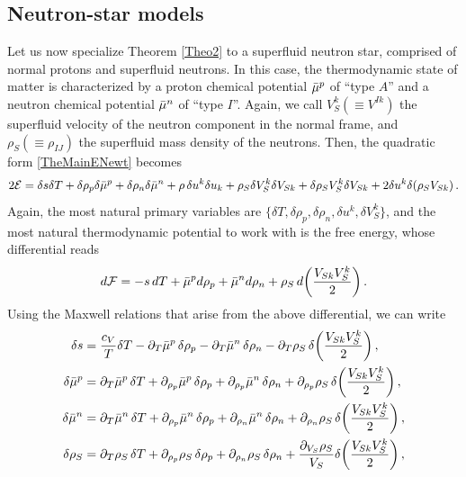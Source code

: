 \documentclass[a4paper, amsfonts, amssymb, amsmath, reprint, showkeys, nofootinbib, twoside,notitlepage,onecolumn]{revtex4-2}
\theoremstyle{definition}
\theoremstyle{theorem}
\theoremstyle{corollary}
\begin{document}
 
\subsection{Neutron-star models}

Let us now specialize Theorem \ref{Theo2} to a superfluid neutron star, comprised of normal protons and superfluid neutrons. In this case, the thermodynamic state of matter is characterized by a proton chemical potential $\Bar{\mu}^p$ of ``type $A$'' and a neutron chemical potential $\Bar{\mu}^n$ of ``type $I$''. Again, we call $V_S^k (\equiv V^{Ik})$ the superfluid velocity of the neutron component in the normal frame, and $\rho_S(\equiv \rho_{IJ})$ the superfluid mass density of the neutrons. Then, the quadratic form \eqref{TheMainENewt} becomes
\begin{equation}\label{NeutronStar}
2\mathcal{E}= \delta s \delta T+ \delta \rho_p \delta \Bar{\mu}^p +\delta \rho_n \delta \Bar{\mu}^n+ \rho\,\delta u^k \delta u_k +\rho_{S} \delta V^{k}_S\delta V_{Sk}  +\delta \rho_{S} V^{k}_S\delta V_{Sk} +2 \delta u^k  \delta ( \rho_{S} V_{Sk})  \, .
\end{equation}
Again, the most natural primary variables are $\{ \delta T, \delta \rho_p,\delta \rho_n,\delta u^k,\delta V_S^k\}$, and the most natural thermodynamic potential to work with is the free energy, whose differential reads
\begin{equation}\label{dPlutarco}
d\mathcal{F}= -s\, dT + \Bar{\mu}^p d\rho_p+ \Bar{\mu}^n d\rho_n  + \rho_S \,  d\bigg(\dfrac{V_{Sk} V_S^{k}}{2} \bigg) \, .
\end{equation}
Using the Maxwell relations that arise from the above differential, we can write
\begin{equation}
\begin{split}
\delta s ={}& \dfrac{c_V}{T} \delta T -\partial_T \Bar{\mu}^p \,  \delta \rho_p-\partial_T \Bar{\mu}^n \,  \delta \rho_n -\partial_T \rho_S \, \delta \bigg(\dfrac{V_{Sk} V_S^{k}}{2} \bigg)  \, , \\
\delta \Bar{\mu}^p ={}& \partial_T \Bar{\mu}^p \,\delta T +\partial_{\rho_p} \Bar{\mu}^p \, \delta \rho_p+\partial_{\rho_p} \Bar{\mu}^n \, \delta \rho_n +\partial_{\rho_p} \rho_S \, \delta \bigg(\dfrac{V_{Sk} V_S^{k}}{2} \bigg)  \, , \\
\delta \Bar{\mu}^n ={}& \partial_T \Bar{\mu}^n \,\delta T +\partial_{\rho_p} \Bar{\mu}^n \, \delta \rho_p+\partial_{\rho_n} \Bar{\mu}^n \, \delta \rho_n +\partial_{\rho_n} \rho_S \, \delta \bigg(\dfrac{V_{Sk} V_S^{k}}{2} \bigg)  \, , \\
\delta \rho_S ={}& \partial_T \rho_S \, \delta T +\partial_{\rho_p} \rho_S \, \delta \rho_p +\partial_{\rho_n} \rho_S \, \delta \rho_n +\dfrac{\partial_{V_S}\rho_S}{V_S} \delta \bigg(\dfrac{V_{Sk} V_S^{k}}{2} \bigg) \, , \\
\end{split}
\end{equation}
\end{document}
